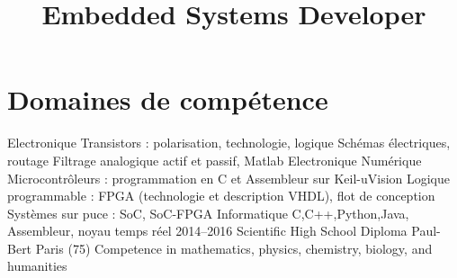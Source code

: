 \documentclass[11pt,a4paper]{moderncv}
\title{Embedded Systems Developer}
\begin{document}
\makecvtitle

\section{Domaines de compétence}
    \cventry
        {}
        {Electronique}
        {}{}{}
        {
            Transistors : polarisation, technologie, logique \newline
            Schémas électriques, routage \newline
            Filtrage analogique actif et passif, Matlab \newline
            \newline
        }
    \cventry
        {}
        {Electronique Numérique}
        {}{}{}
        {
            Microcontrôleurs : programmation en C et Assembleur sur Keil-uVision \newline
            Logique programmable : FPGA (technologie et description VHDL), flot de conception \newline
            Systèmes sur puce : SoC, SoC-FPGA       \newline
        }   
    \cventry
        {}
        {Informatique}
        {}{}{}
        {C,C++,Python,Java, Assembleur, noyau temps réel}  
    \cventry
        {2014--2016}
        {Scientific High School Diploma}
        {Paul-Bert}
        {Paris (75)}
        {}
        {Competence in mathematics, physics, chemistry, biology, and humanities} 
        
\end{document}
